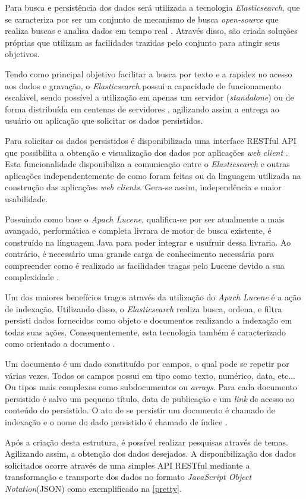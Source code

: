 Para busca e persistência dos dados será utilizada a tecnologia \textit{Elasticsearch}, que se caracteriza por ser um conjunto de mecanismo de busca \textit{open-source} que realiza buscas e analisa dados em tempo real \cite{Gil:2010}. Através disso, são criada soluções próprias que utilizam as  facilidades trazidas pelo conjunto para atingir seus objetivos.

Tendo como principal objetivo facilitar a busca por texto e a rapidez no acesso aos dados e gravação, o \textit{Elasticsearch} possui a capacidade de funcionamento escalável, sendo possível a utilização em apenas um servidor (\textit{standalone}) ou de forma distribuída em centenas de servidores \cite{Gormley:2015}, agilizando assim a entrega ao usuário ou aplicação que solicitar os dados persistidos.

Para solicitar os dados persistidos é disponibilizada uma interface RESTful API que possibilita a obtenção e visualização dos dados por aplicações \textit{web client} \cite{Gormley:2015}. Esta funcionalidade disponibiliza a comunicação entre o \textit{Elasticsearch} e outras aplicações independentemente de como foram feitas ou da linguagem utilizada na construção das aplicações \textit{web clients}. Gera-se assim, independência e maior usabilidade.

Possuindo como base o \textit{Apach Lucene}, qualifica-se por ser atualmente a mais avançado, performática e completa livrara de motor de busca existente, é construído na linguagem Java para poder integrar e usufruir dessa livraria. Ao contrário, é necessário uma grande carga de conhecimento necessária para compreender como é realizado as facilidades tragas pelo Lucene devido a sua complexidade \cite{Gormley:2015}.

Um dos maiores benefícios tragos através da utilização do \textit{Apach Lucene} é a ação de indexação. Utilizando disso, o \textit{Elasticsearch} realiza busca, ordena, e filtra persisti dados fornecidos como objeto e documentos realizando a indexação em todas suas ações. Consequentemente, esta tecnologia também é caracterizado como orientado a documento \cite{Gormley:2015}.

Um documento é um dado constituído por campos, o qual pode se repetir por várias vezes. Todos os campos possui em tipo como texto, numérico, data, etc... Ou tipos mais complexos como subdocumentos ou \textit{arrays}. Para cada documento persistido é salvo um pequeno título, data de publicação e um \textit{link} de acesso ao conteúdo do persistido. O ato de se persistir um documento é chamado de indexação e o nome do dado persistido é chamado de índice \cite{Kuc:2013}.

Após a criação desta estrutura, é possível realizar pesquisas através de temas. Agilizando assim, a obtenção dos dados desejados. A disponibilização dos dados solicitados ocorre através de uma simples API RESTful mediante a transformação e transporte dos dados no formato \textit{JavaScript Object Notation}(JSON) como exemplificado na \autoref{pretty}.

